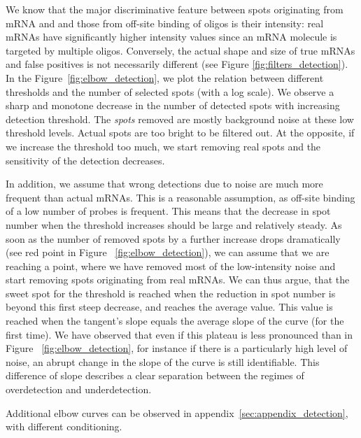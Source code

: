 We know that the major discriminative feature between spots originating from \ac{mRNA} and and those from off-site binding of oligos is their intensity: real mRNAs have significantly higher intensity values since an \ac{mRNA} molecule is targeted by multiple oligos. Conversely, the actual shape and size of true mRNAs and false positives is not necessarily different (see Figure \ref{fig:filters_detection}). 
In the Figure~\ref{fig:elbow_detection}, we plot the relation between different thresholds and the number of selected spots (with a log scale).
We observe a sharp and monotone decrease in the number of detected spots with increasing detection threshold.
The \emph{spots} removed are mostly background noise at these low threshold levels.
Actual spots are too bright to be filtered out.
At the opposite, if we increase the threshold too much, we start removing real spots and the sensitivity of the detection decreases.

In addition, we assume that wrong detections due to noise are much more frequent than actual mRNAs. This is a reasonable assumption, as off-site binding of a low number of probes is frequent. This means that the decrease in spot number when the threshold increases should be large and relatively steady. As soon as the number of removed spots by a further increase drops dramatically (see red point in Figure ~\ref{fig:elbow_detection}), we can assume that we are reaching a point, where we have removed most of the low-intensity noise and start removing spots originating from real mRNAs. 
We can thus argue, that the sweet spot for the threshold is reached when the reduction in spot number is beyond this first steep decrease, and reaches the average value. This value is reached when the tangent's slope equals the average slope of the curve (for the first time). 
We have observed that even if this plateau is less pronounced than in Figure ~\ref{fig:elbow_detection}, for instance if there is a particularly high level of noise, an abrupt change in the slope of the curve is still identifiable.
This difference of slope describes a clear separation between the regimes of overdetection and underdetection.

Additional elbow curves can be observed in appendix~\ref{sec:appendix_detection}, with different conditioning.\\

